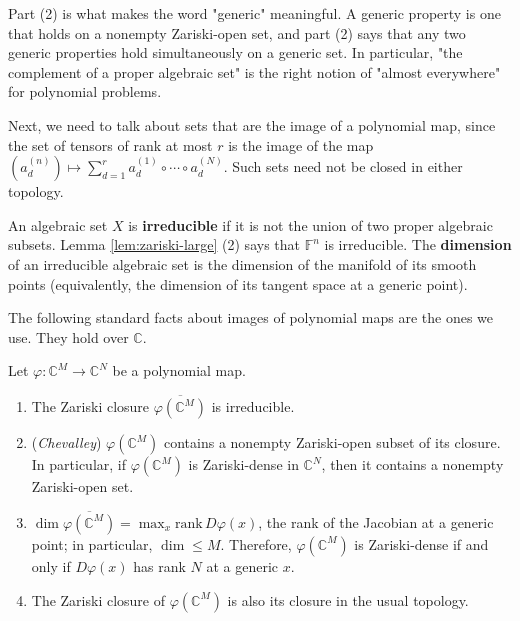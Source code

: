   Part (2) is what makes the word "generic" meaningful. A generic property is one that holds on a nonempty Zariski-open set, and part (2) says that any two generic properties hold simultaneously on a generic set. In particular, "the complement of a proper algebraic set" is the right notion of "almost everywhere" for polynomial problems. 

  Next, we need to talk about sets that are the image of a polynomial map, since the set of tensors of rank at most $r$ is the image of the map $(a_d^{(n)}) \mapsto \sum_{d=1}^r a_d^{(1)} \circ \cdots \circ a_d^{(N)}$. Such sets need not be closed in either topology. 

  \begin{definition}
    An algebraic set $X$ is \textbf{irreducible} if it is not the union of two proper algebraic subsets. Lemma \ref{lem:zariski-large} (2) says that $\mathbb{F}^n$ is irreducible. The \textbf{dimension} of an irreducible algebraic set is the dimension of the manifold of its smooth points (equivalently, the dimension of its tangent space at a generic point). 
  \end{definition}

  The following standard facts about images of polynomial maps are the ones we use. They hold over $\mathbb{C}$. 

  \begin{theorem}
    \label{thm:image-polynomial-map}
    Let $\varphi : \mathbb{C}^M \to \mathbb{C}^N$ be a polynomial map. 
    \begin{enumerate}
      \item The Zariski closure $\overline{\varphi(\mathbb{C}^M)}$ is irreducible. 
      \item (\textit{Chevalley}) $\varphi(\mathbb{C}^M)$ contains a nonempty Zariski-open subset of its closure. In particular, if $\varphi(\mathbb{C}^M)$ is Zariski-dense in $\mathbb{C}^N$, then it contains a nonempty Zariski-open set. 
      \item $\dim \overline{\varphi(\mathbb{C}^M)} = \max_x \mathrm{rank}\, D\varphi(x)$, the rank of the Jacobian at a generic point; in particular, $\dim \leq M$. Therefore, $\varphi(\mathbb{C}^M)$ is Zariski-dense if and only if $D\varphi(x)$ has rank $N$ at a generic $x$. 
      \item The Zariski closure of $\varphi(\mathbb{C}^M)$ is also its closure in the usual topology. 
    \end{enumerate}
  \end{theorem}

